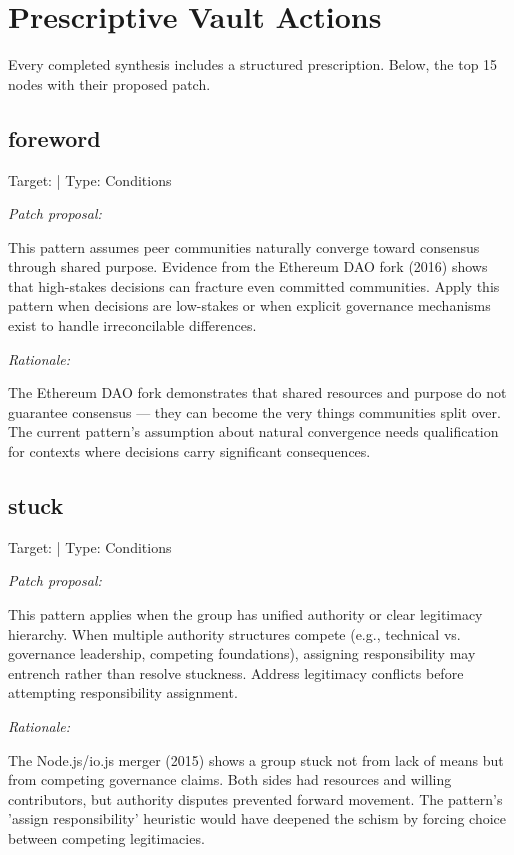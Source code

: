 \documentclass[11pt,a4paper]{article}
\begin{document}
\section{Prescriptive Vault Actions}
Every completed synthesis includes a structured prescription. Below, the top 15 nodes with their proposed patch.

\subsection{foreword}
Target: \texttt{} | Type: Conditions

\textit{Patch proposal:}

This pattern assumes peer communities naturally converge toward consensus through shared purpose. Evidence from the Ethereum DAO fork (2016) shows that high-stakes decisions can fracture even committed communities. Apply this pattern when decisions are low-stakes or when explicit governance mechanisms exist to handle irreconcilable differences.

\textit{Rationale:}

The Ethereum DAO fork demonstrates that shared resources and purpose do not guarantee consensus — they can become the very things communities split over. The current pattern's assumption about natural convergence needs qualification for contexts where decisions carry significant consequences.

\subsection{stuck}
Target: \texttt{} | Type: Conditions

\textit{Patch proposal:}

This pattern applies when the group has unified authority or clear legitimacy hierarchy. When multiple authority structures compete (e.g., technical vs. governance leadership, competing foundations), assigning responsibility may entrench rather than resolve stuckness. Address legitimacy conflicts before attempting responsibility assignment.

\textit{Rationale:}

The Node.js/io.js merger (2015) shows a group stuck not from lack of means but from competing governance claims. Both sides had resources and willing contributors, but authority disputes prevented forward movement. The pattern's 'assign responsibility' heuristic would have deepened the schism by forcing choice between competing legitimacies.
\end{document}
